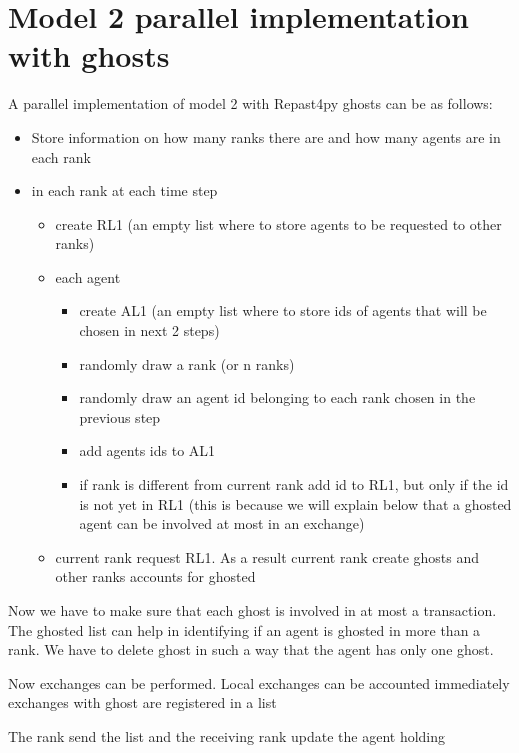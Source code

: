 \documentclass{article}
\providecommand{\tightlist}{%
  \setlength{\itemsep}{0pt}\setlength{\parskip}{0pt}}
\begin{document}
\section{Model 2 parallel implementation with ghosts}
A parallel implementation of model 2 with Repast4py ghosts can be as follows:

\begin{itemize}
\tightlist
\item
  Store information on how many ranks there are and how many agents are
  in each rank
\item
  in each rank at each time step

  \begin{itemize}
  \tightlist
  \item
    create RL1 (an empty list where to store agents to be requested to
    other ranks)
  \item
    each agent

    \begin{itemize}
    \tightlist
    \item
      create AL1 (an empty list where to store ids of agents that will
      be chosen in next 2 steps)
    \item
      randomly draw a rank (or n ranks)
    \item
      randomly draw an agent id belonging to each rank chosen in the
      previous step
    \item
      add agents ids to AL1
    \item
      if rank is different from current rank add id to RL1, but only if
      the id is not yet in RL1 (this is because we will explain below
      that a ghosted agent can be involved at most in an exchange)
    \end{itemize}
  \item
    current rank request RL1. As a result current rank create ghosts and
    other ranks accounts for ghosted
  \end{itemize}
\end{itemize}

Now we have to make sure that each ghost is involved in at most a
transaction. The ghosted list can help in identifying if an agent is
ghosted in more than a rank. We have to delete ghost in such a way that
the agent has only one ghost.

Now exchanges can be performed. Local exchanges can be accounted
immediately exchanges with ghost are registered in a list

The rank send the list and the receiving rank update the agent holding
\end{document}
